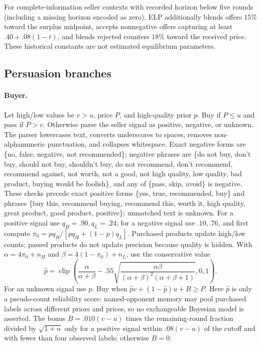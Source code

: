 For complete-information seller contexts with recorded horizon below five
rounds (including a missing horizon encoded as zero), ELP additionally blends
offers $15\%$ toward the surplus midpoint, accepts nonnegative offers capturing
at least $.40+.08(1-t)$, and blends rejected counters $18\%$ toward the received
price. These historical constants are not estimated equilibrium parameters.

\subsection{Persuasion branches}

\paragraph{Buyer.}
Let high/low values be $v>u$, price $P$, and high-quality prior $p$. Buy if
$P\le u$ and pass if $P>v$. Otherwise parse the seller signal as positive,
negative, or unknown. The parser lowercases text, converts underscores to
spaces, removes non-alphanumeric punctuation, and collapses whitespace. Exact
negative forms are \{no, false, negative, not recommended\}; negative phrases
are \{do not buy, don't buy, should not buy, shouldn't buy, do not recommend,
don't recommend, recommend against, not worth, not a good, not high quality,
low quality, bad product, buying would be foolish\}, and any of \{pass, skip,
avoid\} is negative. These checks precede exact positive forms \{yes, true,
recommended, buy\} and phrases \{buy this, recommend buying, recommend this,
worth it, high quality, great product, good product, positive\}; unmatched text
is unknown.
For a positive signal use $q_H=.90,q_L=.24$; for a
negative signal use $.10,.76$, and first compute
$\pi_0=pq_H/[pq_H+(1-p)q_L]$. Purchased products update high/low counts; passed
products do not update precision because quality is hidden. With
$\alpha=4\pi_0+n_H$ and $\beta=4(1-\pi_0)+n_L$, use the conservative value
\[
 \hat p=\operatorname{clip}\left(
 \frac{\alpha}{\alpha+\beta}-.55
 \sqrt{\frac{\alpha\beta}{(\alpha+\beta)^2(\alpha+\beta+1)}},0,1\right).
\]
For an unknown signal use $p$. Buy when
$\hat p v+(1-\hat p)u+B\ge P$. Here $\hat p$ is only a pseudo-count reliability
score: named-opponent memory may pool purchased labels across different priors
and prices, so no exchangeable Bayesian model is asserted. The bonus
$B=.010(v-u)$ times the remaining-round
fraction divided by $\sqrt{1+n}$ only for a positive signal within $.08(v-u)$
of the cutoff and with fewer than four observed labels; otherwise $B=0$.

